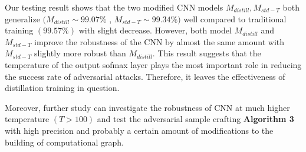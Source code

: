 \documentclass{article}
\begin{document}
Our testing result shows that the two modified CNN models $M_{distill},M_{std-T}$ both generalize $(M_{distill} \sim 99.07\%$ , $M_{std-T} \sim 99.34\%)$ well compared to traditional training $(99.57\%)$ with slight decrease. 
However, both model $M_{distill}$ and $M_{std-T}$ improve the robustness of the CNN by almost the same amount with $M_{std-T}$ slightly more robust than $M_{distill}$. This result suggests that the temperature of the output sofmax layer plays the most important role in reducing the success rate of adversarial attacks. Therefore, it leaves the effectiveness of distillation training in question.

Moreover, further study can investigate the robustness of CNN at much higher temperature $(T > 100)$ and test the adversarial sample crafting \textbf{Algorithm 3} with high precision and probably a certain amount of modifications to the building of computational graph.




\newpage
\appendix
\end{document}

